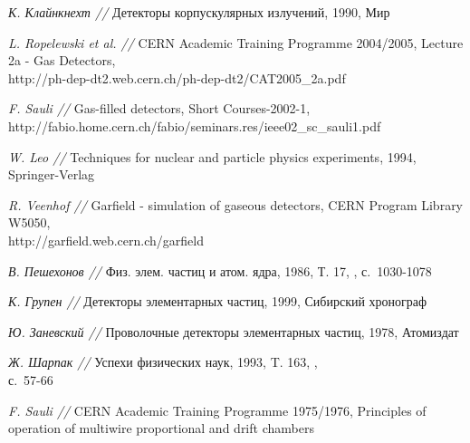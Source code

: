 \documentclass[a4paper,12pt,titlepage]{article}
\providecommand{\No}{\textnumero}   %
\begin{document}
\begin{thebibliography}{99}
  \emph{К. Клайнкнехт //} Детекторы корпускулярных излучений, 1990, Мир

  \emph{L. Ropelewski et al. //} CERN Academic Training Programme 2004/2005,
  Lecture 2a - Gas Detectors, \\
  http://ph-dep-dt2.web.cern.ch/ph-dep-dt2/CAT2005\_2a.pdf

  \emph{F. Sauli //} Gas-filled detectors, Short Courses-2002-1,\\
  http://fabio.home.cern.ch/fabio/seminars.res/ieee02\_sc\_sauli1.pdf

  \emph{W. Leo //} Techniques for nuclear and particle physics experiments,
  1994, Springer-Verlag

  \emph{R. Veenhof //} Garfield - simulation of gaseous detectors,
  CERN Program Library W5050, \\ http://garfield.web.cern.ch/garfield

  \emph{В. Пешехонов //} Физ. элем. частиц и атом. ядра, 1986, Т. 17,
  \No 5, с.~1030-1078

  \emph{К. Групен //} Детекторы элементарных частиц, 1999, Сибирский
  хронограф

  \emph{Ю. Заневский //} Проволочные детекторы элементарных частиц,
  1978, Атомиздат

  \emph{Ж. Шарпак //} Успехи физических наук, 1993, T. 163, \No 10, \\
  с.~57-66

  \emph{F. Sauli //} CERN Academic Training Programme 1975/1976,
  Principles of operation of multiwire proportional and drift chambers
\end{thebibliography}
\end{document}
